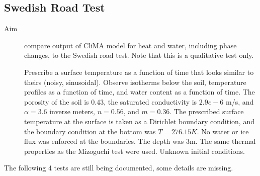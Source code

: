 \documentclass[twoside,10pt]{report}
\begin{document}
\subsection{Swedish Road Test}

\begin{description}
\item [Aim] compare output of CliMA model for heat and water, including phase changes, to the \citet{Hansson04a} Swedish road test. Note that this is a qualitative test only.

Prescribe a surface temperature as a function of time that looks similar to theirs (noisy, sinusoidal). Observe isotherms below the soil, temperature profiles as a function of time, and water content as a function of time. The porosity of the soil is $0.43$, the saturated conductivity is $2.9e-6$ m/s, and $\alpha = 3.6$ inverse meters, $n = 0.56$, and $m = 0.36$. The prescribed surface temperature at the surface is taken as a Dirichlet boundary condition, and the boundary condition at the bottom was $T = 276.15K$. No water or ice flux was enforced at the boundaries. The depth was 3m. The same thermal properties as the Mizoguchi test were used. Unknown initial conditions. 
\end{description}


The following 4 tests are still being documented, some details are missing.
\end{document}
